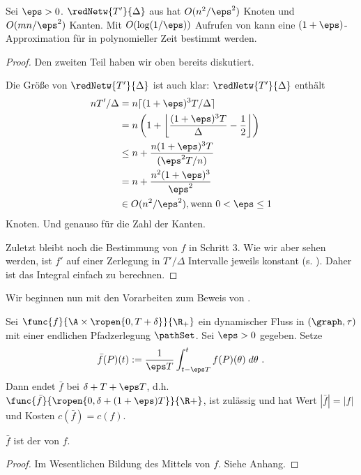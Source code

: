 \begin{theorem}
    Sei $\eps > 0$. $\redNetw{T'}{\Delta}$ aus  hat
    $O(n^2/\eps^2)$ Knoten und $O(mn/\eps^2)$ Kanten. Mit $O(\log(1/\eps))$
    Aufrufen von  kann eine $(1+\eps)$-Approximation
    für  in polynomieller Zeit bestimmt werden.
    \begin{proof}
        Den zweiten Teil haben wir oben bereits diskutiert.

        Die Größe von $\redNetw{T'}{\Delta}$ ist auch klar:
        $\redNetw{T'}{\Delta}$ enthält
        \begin{align*}
            n T'/\Delta & = n \lceil (1 + \eps)^3 T/\Delta \rceil \\
                        & = n \left(1 + \left\lfloor \frac{(1 + \eps)^3 T}{\Delta}
                            -\frac{1}{2} \right\rfloor \right) \\
                        & \leq n + \frac{n(1 + \eps)^3T}{(\eps^2T/n)} \\
                        & = n + \frac{n^2(1 + \eps)^3}{\eps^2} \\
                        & \in O(n^2/\eps^2), \text{wenn } 0 < \eps \leq 1
        \end{align*}
        Knoten. Und genauso für die Zahl der Kanten.

        Zuletzt bleibt noch die Bestimmung von $f$ in Schritt 3. Wie wir aber
        sehen werden, ist $f'$ auf einer Zerlegung in $T'/\Delta$ Intervalle
        jeweils konstant (s. ). Daher ist das Integral einfach
        zu berechnen.
    \end{proof}
\end{theorem}

Wir beginnen nun mit den Vorarbeiten zum Beweis von .

\begin{lemma}\label{lem:flow_avg}
    Sei $\func{f}{\A \times \ropen{0, T + \delta}}{\R_+}$ ein dynamischer Fluss in
    $(\graph, \tau)$ mit einer endlichen Pfadzerlegung $\pathSet$.
    Sei $\eps > 0$ gegeben. Setze
    \[
    \bar{f}(P)(t) := \frac{1}{\eps T}
                            \int_{t - \eps T}^{t} f(P)(\theta) \; d\theta \text{ .}
    \]
    Dann endet $\bar{f}$ bei $\delta + T + \eps T$,
    d.h. $\func{\bar{f}}{\ropen{0, \delta + (1+\eps)T}}{\R+}$, ist zulässig und hat Wert
    $|\bar{f}| = |f|$ und Kosten $c(\bar{f}) = c(f)$.

    $\bar{f}$ ist der  von $f$.

    \begin{proof}
        Im Wesentlichen Bildung des Mittels von $f$. Siehe Anhang.
    \end{proof}
\end{lemma}

